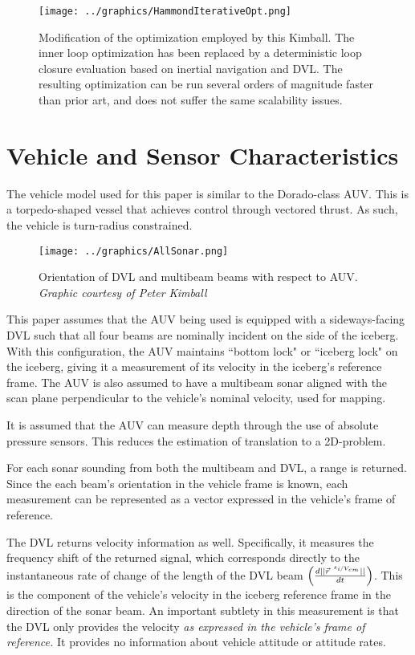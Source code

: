 \begin{figure}[htbp]
   \centering
   \texttt{[image: ../graphics/HammondIterativeOpt.png]} %
   \caption{Modification of the optimization employed by this Kimball. The inner loop optimization has been replaced by a deterministic loop closure evaluation based on inertial navigation and DVL. The resulting optimization can be run several orders of magnitude faster than prior art, and does not suffer the same scalability issues.}
   \label{fig:NestedLoop2}
\end{figure}

\section{Vehicle and Sensor Characteristics}
\label{sec.VehicleSetup}
The vehicle model used for this paper is similar to the Dorado-class AUV. This is a torpedo-shaped vessel that achieves control through vectored thrust. As such, the vehicle is turn-radius constrained. 

\begin{figure}[htbp]
   \centering
   \texttt{[image: ../graphics/AllSonar.png]} %
   \caption{Orientation of DVL and multibeam beams with respect to AUV.  \emph{Graphic courtesy of Peter Kimball}}
   \label{fig:DVL}
\end{figure}


This paper assumes that the AUV being used is equipped with a sideways-facing DVL such that all four beams are nominally incident on the side of the iceberg. With this configuration, the AUV maintains ``bottom lock" or ``iceberg lock" on the iceberg, giving it a measurement of its velocity in the iceberg's reference frame. The AUV is also assumed to have a multibeam sonar aligned with the scan plane perpendicular to the vehicle's nominal velocity, used for mapping. 

It is assumed that the AUV can measure depth through the use of absolute pressure sensors. This reduces the estimation of translation to a 2D-problem.

For each sonar sounding from both the multibeam and DVL, a range is returned. Since the each beam's orientation in the vehicle frame is known, each measurement can be represented as a vector expressed in the vehicle's frame of reference.

The DVL returns velocity information as well. Specifically, it measures the frequency shift of the returned signal, which corresponds directly to the instantaneous rate of change of the length of the DVL beam $\left( \frac{d||\vec{r}^{~\nicefrac{s_i}{V_{cm}}}||}{dt}\right)$. This is the component of the vehicle's velocity in the iceberg reference frame in the direction of the sonar beam. An important subtlety in this measurement is that the DVL only provides the velocity \emph{as expressed in the vehicle's frame of reference.} It provides no information about vehicle attitude or attitude rates. 

